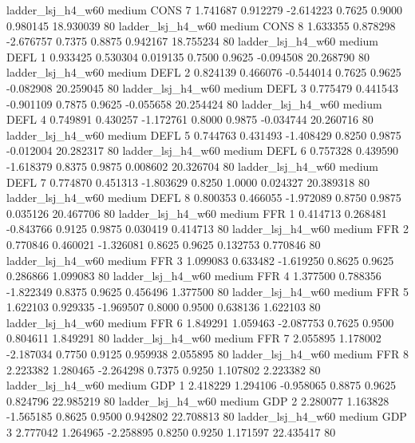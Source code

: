      ladder_lsj_h4_w60     medium     CONS                 7  1.741687 0.912279 -2.614223 0.7625 0.9000  0.980145   18.930039 80
     ladder_lsj_h4_w60     medium     CONS                 8  1.633355 0.878298 -2.676757 0.7375 0.8875  0.942167   18.755234 80
     ladder_lsj_h4_w60     medium     DEFL                 1  0.933425 0.530304  0.019135 0.7500 0.9625 -0.094508   20.268790 80
     ladder_lsj_h4_w60     medium     DEFL                 2  0.824139 0.466076 -0.544014 0.7625 0.9625 -0.082908   20.259045 80
     ladder_lsj_h4_w60     medium     DEFL                 3  0.775479 0.441543 -0.901109 0.7875 0.9625 -0.055658   20.254424 80
     ladder_lsj_h4_w60     medium     DEFL                 4  0.749891 0.430257 -1.172761 0.8000 0.9875 -0.034744   20.260716 80
     ladder_lsj_h4_w60     medium     DEFL                 5  0.744763 0.431493 -1.408429 0.8250 0.9875 -0.012004   20.282317 80
     ladder_lsj_h4_w60     medium     DEFL                 6  0.757328 0.439590 -1.618379 0.8375 0.9875  0.008602   20.326704 80
     ladder_lsj_h4_w60     medium     DEFL                 7  0.774870 0.451313 -1.803629 0.8250 1.0000  0.024327   20.389318 80
     ladder_lsj_h4_w60     medium     DEFL                 8  0.800353 0.466055 -1.972089 0.8750 0.9875  0.035126   20.467706 80
     ladder_lsj_h4_w60     medium      FFR                 1  0.414713 0.268481 -0.843766 0.9125 0.9875  0.030419    0.414713 80
     ladder_lsj_h4_w60     medium      FFR                 2  0.770846 0.460021 -1.326081 0.8625 0.9625  0.132753    0.770846 80
     ladder_lsj_h4_w60     medium      FFR                 3  1.099083 0.633482 -1.619250 0.8625 0.9625  0.286866    1.099083 80
     ladder_lsj_h4_w60     medium      FFR                 4  1.377500 0.788356 -1.822349 0.8375 0.9625  0.456496    1.377500 80
     ladder_lsj_h4_w60     medium      FFR                 5  1.622103 0.929335 -1.969507 0.8000 0.9500  0.638136    1.622103 80
     ladder_lsj_h4_w60     medium      FFR                 6  1.849291 1.059463 -2.087753 0.7625 0.9500  0.804611    1.849291 80
     ladder_lsj_h4_w60     medium      FFR                 7  2.055895 1.178002 -2.187034 0.7750 0.9125  0.959938    2.055895 80
     ladder_lsj_h4_w60     medium      FFR                 8  2.223382 1.280465 -2.264298 0.7375 0.9250  1.107802    2.223382 80
     ladder_lsj_h4_w60     medium      GDP                 1  2.418229 1.294106 -0.958065 0.8875 0.9625  0.824796   22.985219 80
     ladder_lsj_h4_w60     medium      GDP                 2  2.280077 1.163828 -1.565185 0.8625 0.9500  0.942802   22.708813 80
     ladder_lsj_h4_w60     medium      GDP                 3  2.777042 1.264965 -2.258895 0.8250 0.9250  1.171597   22.435417 80
